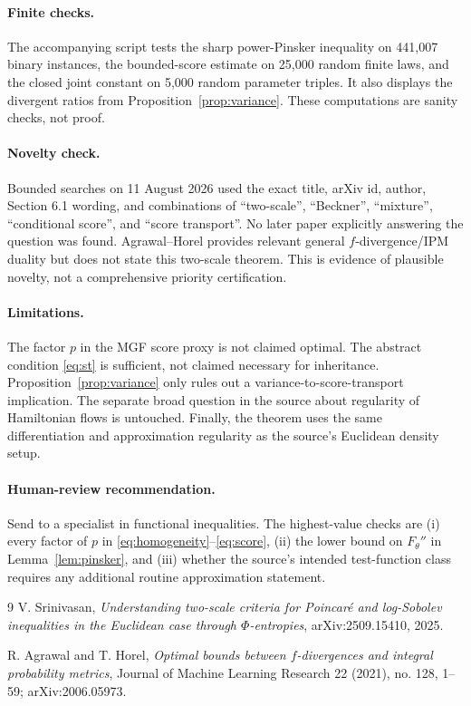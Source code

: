 \documentclass[11pt]{article}
\theoremstyle{remark}
\begin{document}
\paragraph{Finite checks.}
The accompanying script tests the sharp power-Pinsker inequality on 441,007
binary instances, the bounded-score estimate on 25,000 random
finite laws, and the closed joint constant on 5,000 random parameter triples.
It also displays the divergent ratios from Proposition~\ref{prop:variance}.
These computations are sanity checks, not proof.

\paragraph{Novelty check.}
Bounded searches on 11 August 2026 used the exact title, arXiv id, author,
Section 6.1 wording, and combinations of ``two-scale'', ``Beckner'',
``mixture'', ``conditional score'', and ``score transport''.  No later paper
explicitly answering the question was found.  Agrawal--Horel
\cite{agrawal-horel} provides relevant general $f$-divergence/IPM duality but
does not state this two-scale theorem.  This is evidence of plausible novelty,
not a comprehensive priority certification.

\paragraph{Limitations.}
The factor $p$ in the MGF score proxy is not claimed optimal.  The abstract
condition \eqref{eq:st} is sufficient, not claimed necessary for inheritance.
Proposition~\ref{prop:variance} only rules out a variance-to-score-transport
implication.  The separate broad question in the source about regularity of
Hamiltonian flows is untouched.  Finally, the theorem uses the same
differentiation and approximation regularity as the source's Euclidean
density setup.

\paragraph{Human-review recommendation.}
Send to a specialist in functional inequalities.  The highest-value checks
are (i) every factor of $p$ in \eqref{eq:homogeneity}--\eqref{eq:score},
(ii) the lower bound on $F_\theta''$ in Lemma~\ref{lem:pinsker}, and
(iii) whether the source's intended test-function class requires any
additional routine approximation statement.

\begin{thebibliography}{9}
V. Srinivasan,
\emph{Understanding two-scale criteria for Poincar\'e and log-Sobolev
inequalities in the Euclidean case through $\Phi$-entropies},
arXiv:2509.15410, 2025.

R. Agrawal and T. Horel,
\emph{Optimal bounds between $f$-divergences and integral probability
metrics},
Journal of Machine Learning Research 22 (2021), no. 128, 1--59;
arXiv:2006.05973.
\end{thebibliography}
\end{document}
